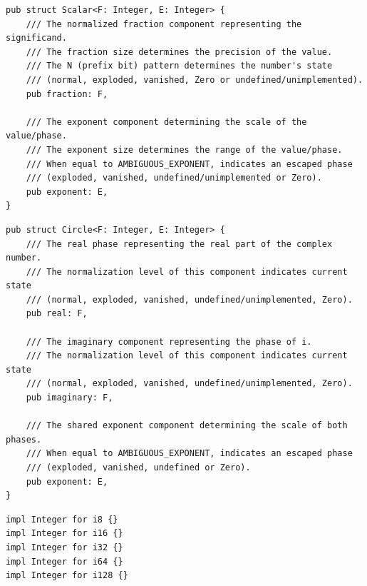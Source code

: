 \documentclass[12pt,letter]{article}
\begin{document}
\begin{lstlisting}[style=rust, caption={Scalar Type Definition in Rust}, label={fig:scalar_structure}]
pub struct Scalar<F: Integer, E: Integer> {
	/// The normalized fraction component representing the significand.
	/// The fraction size determines the precision of the value.
	/// The N (prefix bit) pattern determines the number's state
	/// (normal, exploded, vanished, Zero or undefined/unimplemented).
	pub fraction: F,

	/// The exponent component determining the scale of the value/phase.
	/// The exponent size determines the range of the value/phase.
	/// When equal to AMBIGUOUS_EXPONENT, indicates an escaped phase
	/// (exploded, vanished, undefined/unimplemented or Zero).
	pub exponent: E,
}
\end{lstlisting}

\begin{lstlisting}[style=rust, caption={Circle Type Definition in Rust}, label={fig:circle_structure}]
pub struct Circle<F: Integer, E: Integer> {
	/// The real phase representing the real part of the complex number.
	/// The normalization level of this component indicates current state
	/// (normal, exploded, vanished, undefined/unimplemented, Zero).
	pub real: F,

	/// The imaginary component representing the phase of i.
	/// The normalization level of this component indicates current state
	/// (normal, exploded, vanished, undefined/unimplemented, Zero).
	pub imaginary: F,

	/// The shared exponent component determining the scale of both phases.
	/// When equal to AMBIGUOUS_EXPONENT, indicates an escaped phase
	/// (exploded, vanished, undefined or Zero).
	pub exponent: E,
}
\end{lstlisting}

\begin{lstlisting}[style=rust, caption={Where fraction: F and exponent: E are any sized integer}, label={fig:integer}]
impl Integer for i8 {}
impl Integer for i16 {}
impl Integer for i32 {}
impl Integer for i64 {}
impl Integer for i128 {}
\end{lstlisting}
\end{document}
